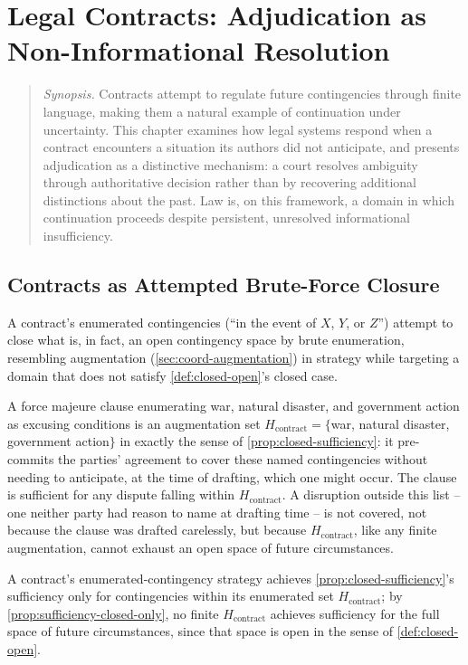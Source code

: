 \chapter{Legal Contracts: Adjudication as Non-Informational Resolution}
\label{ch:contracts}

\begin{quotation}
\noindent\textit{Synopsis.} Contracts attempt to regulate future
contingencies through finite language, making them a natural example of
continuation under uncertainty. This chapter examines how legal systems
respond when a contract encounters a situation its authors did not
anticipate, and presents adjudication as a distinctive mechanism: a court
resolves ambiguity through authoritative decision rather than by
recovering additional distinctions about the past. Law is, on this
framework, a domain in which continuation proceeds despite persistent,
unresolved informational insufficiency.
\end{quotation}

\section{Contracts as Attempted Brute-Force Closure}

A contract's enumerated contingencies (``in the event of $X$, $Y$, or
$Z$'') attempt to close what is, in fact, an open contingency space by
brute enumeration, resembling augmentation (\cref{sec:coord-augmentation})
in strategy while targeting a domain that does not satisfy
\cref{def:closed-open}'s closed case.

\begin{example}
\label{ex:force-majeure}
A force majeure clause enumerating war, natural disaster, and government
action as excusing conditions is an augmentation set $H_{\text{contract}}
= \{$war, natural disaster, government action$\}$ in exactly the sense of
\cref{prop:closed-sufficiency}: it pre-commits the parties' agreement to
cover these named contingencies without needing to anticipate, at the
time of drafting, which one might occur. The clause is sufficient for
any dispute falling within $H_{\text{contract}}$. A disruption outside
this list -- one neither party had reason to name at drafting time --
is not covered, not because the clause was drafted carelessly, but
because $H_{\text{contract}}$, like any finite augmentation, cannot
exhaust an open space of future circumstances.
\end{example}

\begin{proposition}
\label{prop:contract-augmentation-mismatch}
A contract's enumerated-contingency strategy achieves
\cref{prop:closed-sufficiency}'s sufficiency only for contingencies
within its enumerated set $H_{\text{contract}}$; by
\cref{prop:sufficiency-closed-only}, no finite $H_{\text{contract}}$
achieves sufficiency for the full space of future circumstances, since
that space is open in the sense of \cref{def:closed-open}.
\end{proposition}

